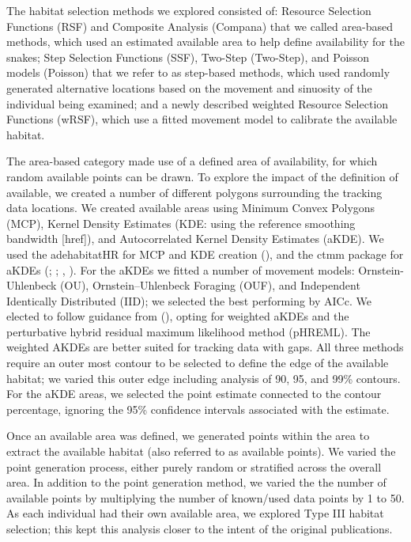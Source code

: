 \documentclass[10pt,a4paper]{article}
\begin{document}
The habitat selection methods we explored consisted of: Resource Selection Functions (RSF) and Composite Analysis (Compana) that we called area-based methods, which used an estimated available area to help define availability for the snakes; Step Selection Functions (SSF), Two-Step (Two-Step), and Poisson models (Poisson) that we refer to as step-based methods, which used randomly generated alternative locations based on the movement and sinuosity of the individual being examined; and a newly described weighted Resource Selection Functions (wRSF), which use a fitted movement model to calibrate the available habitat.

The area-based category made use of a defined area of availability, for which random available points can be drawn.
To explore the impact of the definition of available, we created a number of different polygons surrounding the tracking data locations.
We created available areas using Minimum Convex Polygons (MCP), Kernel Density Estimates (KDE: using the reference smoothing bandwidth {[}href{]}), and Autocorrelated Kernel Density Estimates (aKDE).
We used the adehabitatHR for MCP and KDE creation (), and the ctmm package for aKDEs (; ; , ).
For the aKDEs we fitted a number of movement models: Ornstein-Uhlenbeck (OU), Ornstein--Uhlenbeck Foraging (OUF), and Independent Identically Distributed (IID); we selected the best performing by AICc.
We elected to follow guidance from (), opting for weighted aKDEs and the perturbative hybrid residual maximum likelihood method (pHREML).
The weighted AKDEs are better suited for tracking data with gaps.
All three methods require an outer most contour to be selected to define the edge of the available habitat; we varied this outer edge including analysis of 90, 95, and 99\% contours.
For the aKDE areas, we selected the point estimate connected to the contour percentage, ignoring the 95\% confidence intervals associated with the estimate.

Once an available area was defined, we generated points within the area to extract the available habitat (also referred to as available points).
We varied the point generation process, either purely random or stratified across the overall area.
In addition to the point generation method, we varied the the number of available points by multiplying the number of known/used data points by 1 to 50.
As each individual had their own available area, we explored Type III habitat selection; this kept this analysis closer to the intent of the original publications.
\end{document}
